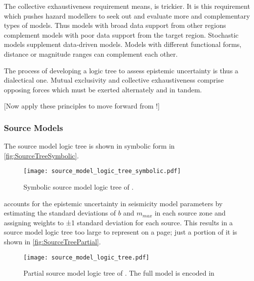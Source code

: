 \documentclass{article}
\begin{document}
The collective exhaustiveness requirement means, is trickier.
It is this requirement which pushes hazard modellers to seek out and evaluate more and complementary types of models.
Thus models with broad data support from other regions complement models with poor data support from the target region.
Stochastic models supplement data-driven models.
Models with different functional forms, distance or magnitude ranges can complement each other.

The process of developing a logic tree to assess epistemic uncertainty is thus a dialectical one.
Mutual exclusivity and collective exhaustiveness comprise opposing forces which must be exerted alternately and in tandem.

[Now apply these principles to move forward from \cite{nath2012probabilistic}!] 

\subsubsection{Source Models}
\label{subsubsec:SourceTree}

The source model logic tree is shown in symbolic form in \autoref{fig:SourceTreeSymbolic}.

\begin{figure}[!htb]
\begin{adjustbox}{center}
\texttt{[image: source\_model\_logic\_tree\_symbolic.pdf]}
\end{adjustbox}
\caption[Symbolic source model logic tree]{Symbolic source model logic tree of \cite{nath2012probabilistic}.}
\label{fig:SourceTreeSymbolic}
\end{figure}

\cite{nath2012probabilistic} accounts for the epistemic uncertainty in seismicity model parameters by estimating the standard deviations of $b$ and $m_{max}$ in each source zone and assigning weights to ±1 standard deviation for each source.
This results in a source model logic tree too large to represent on a page; just a portion of it is shown in \autoref{fig:SourceTreePartial}.

\begin{figure}
\begin{adjustbox}{center}
\texttt{[image: source\_model\_logic\_tree.pdf]}
\end{adjustbox}
\caption[Partial source model logic tree]{Partial source model logic tree of \cite{nath2012probabilistic}.
The full model is encoded in \texttt{}}
\label{fig:SourceTreePartial}
\end{figure}
\end{document}
